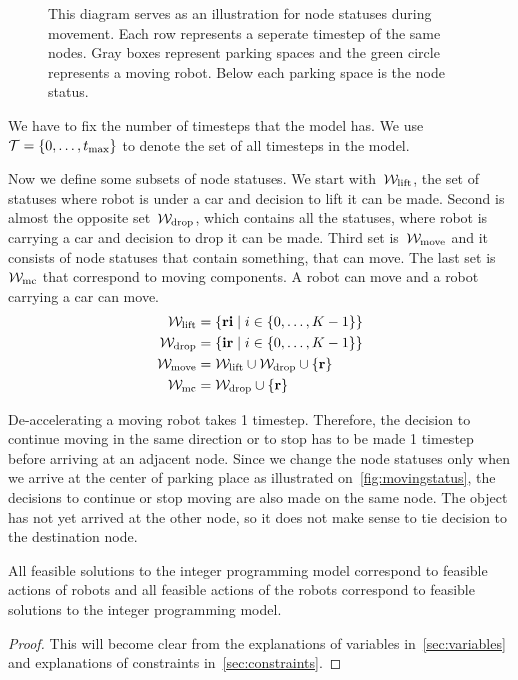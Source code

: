 \begin{figure}[h]
    \begin{center}
        
        \caption{This diagram serves as an illustration for node statuses
            during movement. Each row represents a seperate timestep of the
            same nodes. Gray boxes represent parking spaces and the green
            circle represents a moving robot. Below each parking space is the node
        status.}
        \label{fig:movingstatus}
    \end{center}
\end{figure}

We have to fix the number of timesteps that the model has. We use $\mathcal{T} =
\{0,\ldots,t_{\max}\}$ to denote the set of all timesteps in the model.

Now we define some subsets of node statuses. We start with~$\mathcal{W}_\mathrm{lift}$, the set of
statuses where robot is under a car and decision to lift it can be made. Second
is almost the opposite set~$\mathcal{W}_\mathrm{drop}$, which contains all the statuses, where robot
is carrying a car and decision to drop it can be made. Third set is~$\mathcal{W}_\mathrm{move}$ and
it consists of node statuses that contain something, that can move. The last
set is~$\mathcal{W}_\mathrm{mc}$ that correspond to moving components. A robot can move and a
robot carrying a car can move.
\begin{align}
    \mathcal{W}_\mathrm{lift} &= \{\text{\bf ri} \mid i \in \{0,\ldots,K-1\}\}\\
    \mathcal{W}_\mathrm{drop} &= \{\text{\bf ir} \mid i \in \{0,\ldots,K-1\}\}\\
    \mathcal{W}_\mathrm{move} &= \mathcal{W}_\mathrm{lift} \cup \mathcal{W}_\mathrm{drop} \cup \{\text{\bf r}\}\\
    \mathcal{W}_\mathrm{mc} &= \mathcal{W}_\mathrm{drop} \cup \{\text{\bf r}\}
\end{align}

De-accelerating a moving robot takes 1 timestep. Therefore, the decision to continue
moving in the same direction or to stop has to be made 1 timestep before
arriving at an adjacent node. Since we change the node statuses only when we
arrive at the center of parking place as illustrated
on~\autoref{fig:movingstatus}, the decisions to continue or stop moving are
also made on the same node. The object has not yet arrived at the other node,
so it does not make sense to tie decision to the destination node.

\begin{proposition}
    All feasible solutions to the integer programming model correspond to feasible
    actions of robots and all feasible actions of the robots correspond to
    feasible solutions to the integer programming model.
\end{proposition}
\begin{proof}
    This will become clear from the explanations of variables
    in~\autoref{sec:variables} and explanations of constraints
    in~\autoref{sec:constraints}.
\end{proof}
